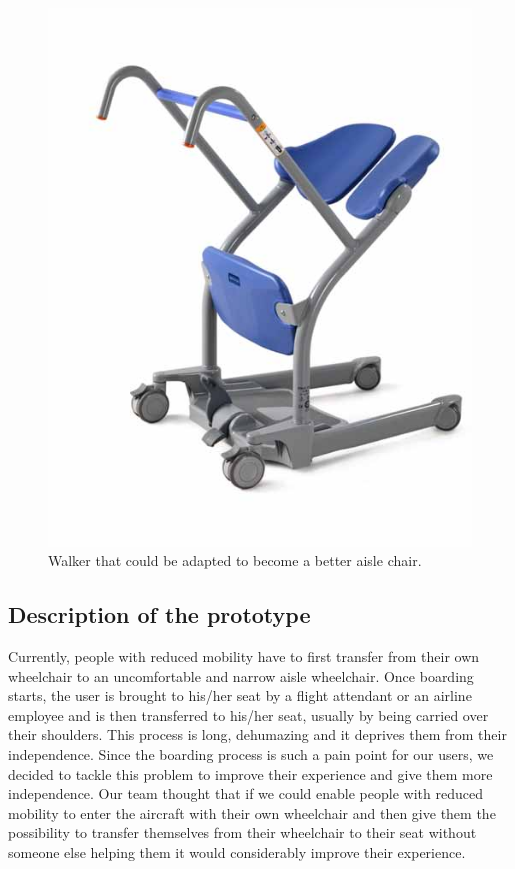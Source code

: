\begin{figure}[h]
  \centering
     \includegraphics[scale=0.5]{images/walker.jpg}
   \caption{Walker that could be adapted to become a better aisle chair.}%
  \label{fig:walker.jpg}
\end{figure} 

\subsection{Description of the prototype}
Currently, people with reduced mobility have to first transfer from their own wheelchair to an uncomfortable and narrow aisle wheelchair. Once boarding starts, the user is brought to his/her seat by a flight attendant or an airline employee and is then transferred to his/her seat, usually by being carried over their shoulders. This process is long, dehumazing and it deprives them from their independence. Since the boarding process is such a pain point for our users, we decided to tackle this problem to improve their experience and give them more independence. Our team thought that if we could enable people with reduced mobility to enter the aircraft with their own wheelchair and then give them the possibility to transfer themselves from their wheelchair to their seat without someone else helping them it would considerably improve their experience.

